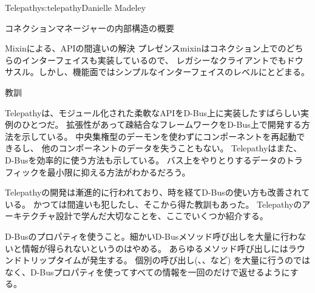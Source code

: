 \begin{aosachapter}{Telepathy}{s:telepathy}{Danielle Madeley}
\begin{aosasect1}{コネクションマネージャーの内部構造の概要}
\begin{aosabox}{Mixinによる、APIの間違いの解決}
プレゼンスmixinはコネクション上でのどちらのインターフェイスも実装しているので、
レガシーなクライアントでもドウサスル。しかし、機能面ではシンプルなインターフェイスのレベルにとどまる。

\end{aosabox}

\end{aosasect1}

\begin{aosasect1}{教訓}

Telepathyは、モジュール化された柔軟なAPIをD-Bus上に実装したすばらしい実例のひとつだ。
拡張性があって疎結合なフレームワークをD-Bus上で開発する方法を示している。
中央集権型のデーモンを使わずにコンポーネントを再起動できるし、
他のコンポーネントのデータを失うこともない。
Telepathyはまた、D-Busを効率的に使う方法も示している。
バス上をやりとりするデータのトラフィックを最小限に抑える方法がわかるだろう。

Telepathyの開発は漸進的に行われており、時を経てD-Busの使い方も改善されている。
かつては間違いも犯したし、そこから得た教訓もあった。
Telepathyのアーキテクチャ設計で学んだ大切なことを、ここでいくつか紹介する。

\begin{aosadescription}

  \item{D-Busのプロパティを使うこと。細かいD-Busメソッド呼び出しを大量に行わないと情報が得られないというのはやめる。}
  あらゆるメソッド呼び出しにはラウンドトリップタイムが発生する。
  個別の呼び出し(、、など)
  を大量に行うのではなく、D-Busプロパティを使ってすべての情報を一回のだけで返せるようにする。


\end{aosadescription}
\end{aosasect1}
\end{aosachapter}
